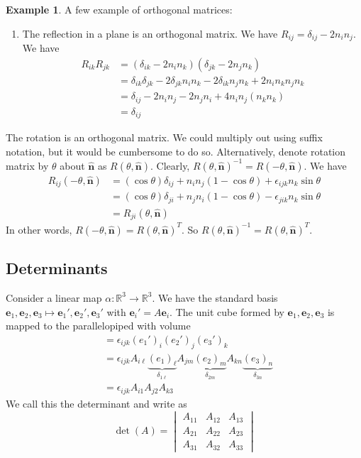 \documentclass[a4paper]{article}
\theoremstyle{definition}
\newtheorem*{eg}{Example}
\newcommand{\mb}[1]{\mathbf{#1}}
\newcommand{\R}{\mathbb{R}}
\begin{document}
\begin{eg}
  A few example of orthogonal matrices:
  \begin{enumerate}
  \item The reflection in a plane is an orthogonal matrix. We have $R_{ij} = \delta_{ij} - 2n_in_j$. We have
    \begin{align*}
      R_{ik}R_{jk} &= (\delta_{ik} - 2n_in_k)(\delta_{jk} - 2n_jn_k)\\
      &= \delta_{ik}\delta_{jk} - 2\delta_{jk}n_in_k - 2\delta_{ik}n_jn_k + 2n_in_kn_jn_k\\
      &= \delta_{ij} - 2n_in_j - 2n_jn_i + 4n_in_j(n_kn_k)\\
      &= \delta_{ij}
    \end{align*}
  \end{enumerate}
  \item The rotation is an orthogonal matrix. We could multiply out using suffix notation, but it would be cumbersome to do so. Alternatively, denote rotation matrix by $\theta$ about $\mb{\hat n}$ as $R(\theta, \mb{\hat n})$. Clearly, $R(\theta, \mb{\hat n})^{-1} = R(-\theta, \mb{\hat n})$. We have
    \begin{align*}
      R_{ij}(-\theta, \mb{\hat n}) &= (\cos\theta)\delta_{ij} + n_in_j(1 - \cos\theta) + \epsilon_{ijk}n_k\sin\theta\\
      &= (\cos\theta)\delta_{ji} + n_jn_i(1 - \cos\theta) - \epsilon_{jik}n_k\sin\theta\\
      &= R_{ji}(\theta, \mb{\hat n})
    \end{align*}
    In other words, $R(-\theta, \mb{\hat n}) = R(\theta, \mb{\hat n})^T$. So $R(\theta, \mb{\hat n})^{-1} = R(\theta, \mb{\hat n})^T$.
\end{eg}

\subsection{Determinants}

Consider a linear map $\alpha: \R^3\to \R^3$. We have the standard basis $\mb{e}_1, \mb{e}_2, \mb{e}_3\mapsto \mb{e}_1', \mb{e}_2', \mb{e}_3'$ with $\mb{e}_i' = A\mb{e}_i$. The unit cube formed by $\mb{e}_1, \mb{e}_2, \mb{e}_3$ is mapped to the parallelopiped with volume
\begin{align*}
  [\mb{e}_1', \mb{e}_2', \mb{e}_3'] &= \epsilon_{ijk}(e_1')_i (e_2')_j (e_3')_k\\
  &= \epsilon_{ijk} A_{i\ell} \underbrace{(e_1)_\ell}_{\delta_{1\ell}} A_{jm}\underbrace{(e_2)_m}_{\delta_{2m}} A_{kn}\underbrace{(e_3)_n}_{\delta_{3n}}\\
  &= \epsilon_{ijk} A_{i1}A_{j2}A_{k3}
\end{align*}
We call this the determinant and write as
\[
\det(A) = \begin{vmatrix} A_{11} & A_{12} & A_{13}\\A_{21} & A_{22} & A_{23} \\ A_{31} & A_{32} & A_{33}\end{vmatrix}
\]
\end{document}
